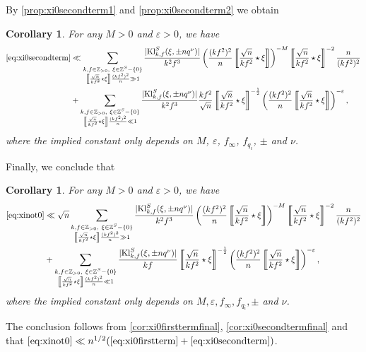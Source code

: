 \documentclass[10pt,oneside,reqno]{amsart}
\makeatletter
\newcommand\ZZ{\mathbb{Z}}
\newcommand\Kl{\mathrm{Kl}}
\theoremstyle{THEOREM}
\newtheorem{corollary}[theorem]{Corollary}
\theoremstyle{DEFINITION}
\theoremstyle{EXERCISE}
\numberwithin{equation}{section}
\renewenvironment{proof}[1][\proofname]{\par
  \vspace{-6pt}
  \pushQED{\qed}
  \normalfont \topsep6\p@\@plus6\p@\relax
  \trivlist
  \item[\hskip\labelsep\rmfamily\bfseries
    #1\@addpunct{:}]\ignorespaces
}{
  \popQED\endtrivlist\@endpefalse
  \vspace{-6pt}
}
\makeatother
\begin{document}
By \autoref{prop:xi0secondterm1} and \autoref{prop:xi0secondterm2} we obtain
\begin{corollary}\label{cor:xi0secondtermfinal}
For any $M>0$ and $\varepsilon>0$, we have
\begin{align*}
\eqref{eq:xi0secondterm}&\ll \sum_{\substack{k,f\in \ZZ_{>0},\ \xi\in \ZZ^S-\{0\}\\\left\llbracket\frac{\sqrt{n}}{kf^2}\star \xi\right\rrbracket\frac {(kf^2)^2}{n} \gg 1}}\frac{|\Kl_{k,f}^S(\xi,\pm nq^\nu)|}{k^2f^3}\left(\frac{(kf^2)^2}{n}\left\llbracket\frac{\sqrt{n}}{kf^2}\star \xi\right\rrbracket\right)^{-M} \left\llbracket\frac{\sqrt{n}}{kf^2}\star \xi\right\rrbracket^{-2}\frac{n}{(kf^2)^2}\\
&+ \sum_{\substack{k,f\in \ZZ_{>0},\ \xi\in \ZZ^S-\{0\}\\\left\llbracket\frac{\sqrt{n}}{kf^2}\star \xi\right\rrbracket\frac {(kf^2)^2}{n} \ll 1}}\frac{|\Kl_{k,f}^S(\xi,\pm nq^\nu)|}{k^2f^3}\frac{kf^2}{\sqrt{n}}\left\llbracket\frac{\sqrt{n}}{kf^2}\star \xi\right\rrbracket^{-\frac 12}\left(\frac{(kf^2)^2}{n}\left\llbracket\frac{\sqrt{n}}{kf^2}\star \xi\right\rrbracket\right)^{-\varepsilon},
\end{align*}
where the implied constant only depends on $M$, $\varepsilon$, $f_\infty$, $f_{q_i}$, $\pm$ and $\nu$.
\end{corollary}

Finally, we conclude that
\begin{corollary}\label{cor:xi0firstestimate}
For any $M>0$ and $\varepsilon>0$, we have
\begin{align*}
\eqref{eq:xinot0}&\ll \sqrt{n} \sum_{\substack{k,f\in \ZZ_{>0},\ \xi\in \ZZ^S-\{0\}\\\left\llbracket\frac{\sqrt{n}}{kf^2}\star \xi\right\rrbracket\frac {(kf^2)^2}{n} \gg 1}}\frac{|\Kl_{k,f}^S(\xi,\pm nq^\nu)|}{k^2f^3}\left(\frac{(kf^2)^2}{n}\left\llbracket\frac{\sqrt{n}}{kf^2}\star \xi\right\rrbracket\right)^{-M} \left\llbracket\frac{\sqrt{n}}{kf^2}\star \xi\right\rrbracket^{-2}\frac{n}{(kf^2)^2}\\
&+ \sum_{\substack{k,f\in \ZZ_{>0},\ \xi\in \ZZ^S-\{0\}\\\left\llbracket\frac{\sqrt{n}}{kf^2}\star \xi\right\rrbracket\frac {(kf^2)^2}{n} \ll 1}}\frac{|\Kl_{k,f}^S(\xi,\pm nq^\nu)|}{kf}\left\llbracket\frac{\sqrt{n}}{kf^2}\star \xi\right\rrbracket^{-\frac 12}\left(\frac{(kf^2)^2}{n}\left\llbracket\frac{\sqrt{n}}{kf^2}\star \xi\right\rrbracket\right)^{-\varepsilon},
\end{align*}
where the implied constant only depends on $M,\varepsilon,f_\infty,f_{q_i},\pm$ and $\nu$.
\end{corollary}
\begin{proof}
The conclusion follows from \autoref{cor:xi0firsttermfinal}, \autoref{cor:xi0secondtermfinal} and that $
\eqref{eq:xinot0}\ll n^{1/2}(\eqref{eq:xi0firstterm}+\eqref{eq:xi0secondterm})$.
\end{proof}
\end{document}
